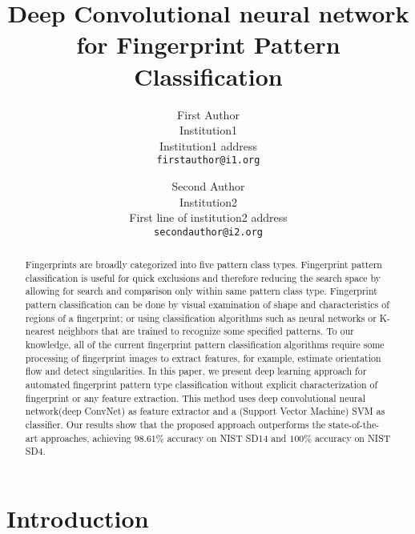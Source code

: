 \documentclass[10pt,twocolumn,letterpaper]{article}
\begin{document}
\title{Deep Convolutional neural network for Fingerprint Pattern Classification}

\author{First Author\\
Institution1\\
Institution1 address\\
{\tt\small firstauthor@i1.org}
\and
Second Author\\
Institution2\\
First line of institution2 address\\
{\tt\small secondauthor@i2.org}
}

\maketitle
\thispagestyle{empty}

\begin{abstract}
   Fingerprints are broadly categorized into five pattern class types.
   Fingerprint pattern classification is useful for quick exclusions and 
   therefore reducing the search space by allowing for search and 
   comparison only within same pattern class type.
   Fingerprint pattern classification can be done by visual examination of
   shape and characteristics of regions of a fingerprint; or using classification 
   algorithms such as neural networks or K-nearest neighbors that are trained 
   to recognize some specified patterns.  To our knowledge, all of the current 
   fingerprint pattern classification algorithms require some processing of 
   fingerprint images to extract features, for example, estimate orientation flow 
   and detect singularities.   In this paper, we present deep learning approach 
   for automated fingerprint pattern type classification without explicit characterization  
   of fingerprint or any feature extraction. 
   {
	\color{red}
	This method uses deep convolutional neural network(deep ConvNet) as feature extractor and a (Support Vector Machine) SVM as classifier.
	Our results show that the proposed approach outperforms the state-of-the-art approaches, achieving $98.61\%$ accuracy on NIST SD14 and $100\%$ accuracy on NIST SD4.
}
\end{abstract}

\section{Introduction}

\end{document}

